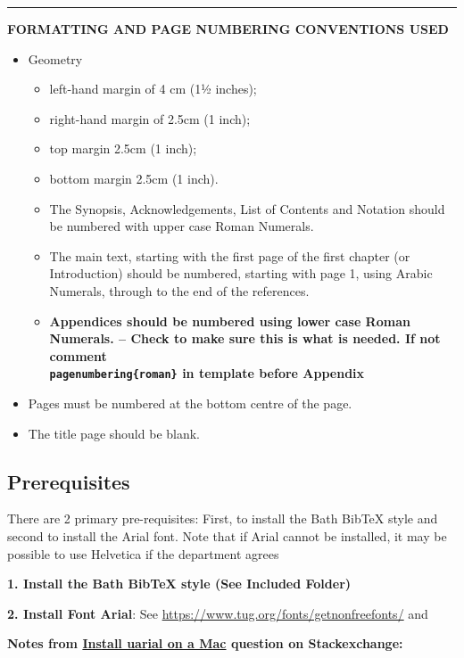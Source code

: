 {\color{red} \rule{\linewidth}{0.5mm}}

\textbf{FORMATTING AND PAGE NUMBERING CONVENTIONS USED}

\begin{itemize}
	\item Geometry
	\begin{itemize}
		\item left-hand margin of 4 cm (11⁄2 inches);
		\item right-hand margin of 2.5cm (1 inch);
		\item top margin 2.5cm (1 inch);
		\item bottom margin 2.5cm (1 inch).
	\end{itemize}
	\begin{itemize}
		\item The Synopsis, Acknowledgements, List of Contents and Notation should be numbered with upper case Roman Numerals.
		\item The main text, starting with the first page of the first chapter (or Introduction) should be numbered, starting with page 1, using Arabic Numerals, through to the end of the references.
		\item \textbf{Appendices should be numbered using lower case Roman Numerals. -- Check to make sure this is what is needed. If not comment \texttt{\\pagenumbering\{roman\}} in template before Appendix}
	\end{itemize}
	\item Pages must be numbered at the bottom centre of the page.
	\item The title page should be blank.
\end{itemize}

\subsection{Prerequisites}

There are 2 primary pre-requisites: First, to install the Bath BibTeX style and second to install the Arial font. Note that if Arial cannot be installed, it may be possible to use Helvetica if the department agrees 

\textbf{1. Install the Bath BibTeX style (See Included Folder)}

\textbf{2. Install Font Arial}: See \hyperlink{https://www.tug.org/fonts/getnonfreefonts/}{https://www.tug.org/fonts/getnonfreefonts/} and 

\textbf{Notes from \hyperlink{https://tex.stackexchange.com/questions/37120/how-can-i-install-uarial-sty-on-a-mac}{Install uarial on a Mac} question on Stackexchange: }

